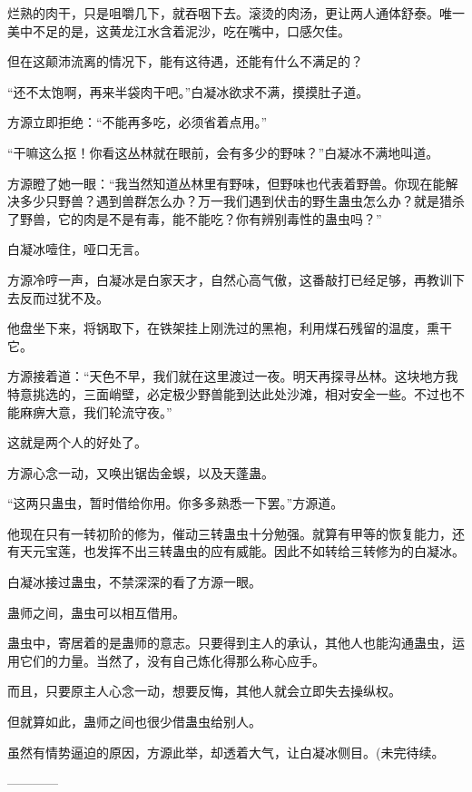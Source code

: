 \begin{this_body}
烂熟的肉干，只是咀嚼几下，就吞咽下去。滚烫的肉汤，更让两人通体舒泰。唯一美中不足的是，这黄龙江水含着泥沙，吃在嘴中，口感欠佳。

但在这颠沛流离的情况下，能有这待遇，还能有什么不满足的？

“还不太饱啊，再来半袋肉干吧。”白凝冰欲求不满，摸摸肚子道。

方源立即拒绝：“不能再多吃，必须省着点用。”

“干嘛这么抠！你看这丛林就在眼前，会有多少的野味？”白凝冰不满地叫道。

方源瞪了她一眼：“我当然知道丛林里有野味，但野味也代表着野兽。你现在能解决多少只野兽？遇到兽群怎么办？万一我们遇到伏击的野生蛊虫怎么办？就是猎杀了野兽，它的肉是不是有毒，能不能吃？你有辨别毒性的蛊虫吗？”

白凝冰噎住，哑口无言。

方源冷哼一声，白凝冰是白家天才，自然心高气傲，这番敲打已经足够，再教训下去反而过犹不及。

他盘坐下来，将锅取下，在铁架挂上刚洗过的黑袍，利用煤石残留的温度，熏干它。

方源接着道：“天色不早，我们就在这里渡过一夜。明天再探寻丛林。这块地方我特意挑选的，三面峭壁，必定极少野兽能到达此处沙滩，相对安全一些。不过也不能麻痹大意，我们轮流守夜。”

这就是两个人的好处了。

方源心念一动，又唤出锯齿金蜈，以及天蓬蛊。

“这两只蛊虫，暂时借给你用。你多多熟悉一下罢。”方源道。

他现在只有一转初阶的修为，催动三转蛊虫十分勉强。就算有甲等的恢复能力，还有天元宝莲，也发挥不出三转蛊虫的应有威能。因此不如转给三转修为的白凝冰。

白凝冰接过蛊虫，不禁深深的看了方源一眼。

蛊师之间，蛊虫可以相互借用。

蛊虫中，寄居着的是蛊师的意志。只要得到主人的承认，其他人也能沟通蛊虫，运用它们的力量。当然了，没有自己炼化得那么称心应手。

而且，只要原主人心念一动，想要反悔，其他人就会立即失去操纵权。

但就算如此，蛊师之间也很少借蛊虫给别人。

虽然有情势逼迫的原因，方源此举，却透着大气，让白凝冰侧目。(未完待续。

------------

\end{this_body}

